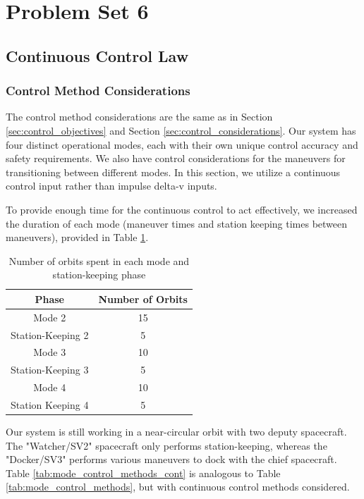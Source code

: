 \section{Problem Set 6}

\subsection{Continuous Control Law}

\subsubsection{Control Method Considerations}

The control method considerations are the same as in Section \ref{sec:control_objectives} and Section \ref{sec:control_considerations}. Our system has four distinct operational modes, each with their own unique control accuracy and safety requirements. We also have control considerations for the maneuvers for transitioning between different modes. In this section, we utilize a continuous control input rather than impulse delta-v inputs.

To provide enough time for the continuous control to act effectively, we increased the duration of each mode (maneuver times and station keeping times between maneuvers), provided in Table \ref{tab:mode_durations_cont}.

\begin{table}[h!]
\centering
\begin{tabular}{|c|c|}
\hline
\textbf{Phase} & \textbf{Number of Orbits} \\
\hline
Mode 2 & 15 \\
Station-Keeping 2 & 5 \\
Mode 3 & 10 \\
Station-Keeping 3 & 5 \\
Mode 4 & 10 \\
Station Keeping 4 & 5 \\
\hline
\end{tabular}
\caption{Number of orbits spent in each mode and station-keeping phase} \label{tab:mode_durations_cont}
\end{table}

Our system is still working in a near-circular orbit with two deputy spacecraft. The "Watcher/SV2" spacecraft only performs station-keeping, whereas the "Docker/SV3" performs various maneuvers to dock with the chief spacecraft. Table \ref{tab:mode_control_methods_cont} is analogous to Table \ref{tab:mode_control_methods}, but with continuous control methods considered.


